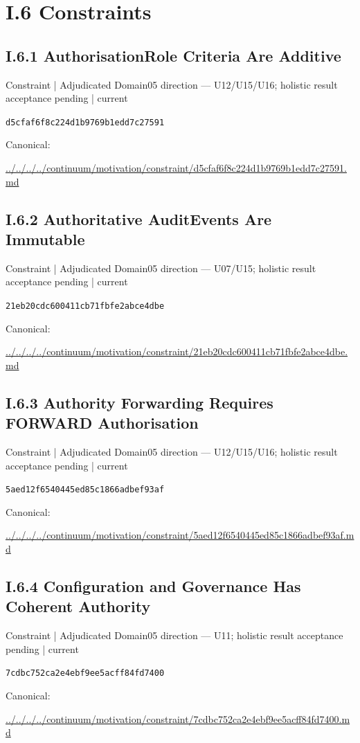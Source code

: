 \documentclass[10pt,a4paper]{article}
\begin{document}
\section*{I.6 Constraints}
\subsection*{I.6.1 AuthorisationRole Criteria Are Additive}
\label{element-d5cfaf6f8c224d1b9769b1edd7c27591}
{\small Constraint | Adjudicated Domain05 direction — U12/U15/U16; holistic result acceptance pending | current}\par
\texttt{d5cfaf6f8c224d1b9769b1edd7c27591}\par
Canonical: \par
{\footnotesize\url{../../../../continuum/motivation/constraint/d5cfaf6f8c224d1b9769b1edd7c27591.md}}\par
\subsection*{I.6.2 Authoritative AuditEvents Are Immutable}
\label{element-21eb20cdc600411cb71fbfe2abce4dbe}
{\small Constraint | Adjudicated Domain05 direction — U07/U15; holistic result acceptance pending | current}\par
\texttt{21eb20cdc600411cb71fbfe2abce4dbe}\par
Canonical: \par
{\footnotesize\url{../../../../continuum/motivation/constraint/21eb20cdc600411cb71fbfe2abce4dbe.md}}\par
\subsection*{I.6.3 Authority Forwarding Requires FORWARD Authorisation}
\label{element-5aed12f6540445ed85c1866adbef93af}
{\small Constraint | Adjudicated Domain05 direction — U12/U15/U16; holistic result acceptance pending | current}\par
\texttt{5aed12f6540445ed85c1866adbef93af}\par
Canonical: \par
{\footnotesize\url{../../../../continuum/motivation/constraint/5aed12f6540445ed85c1866adbef93af.md}}\par
\subsection*{I.6.4 Configuration and Governance Has Coherent Authority}
\label{element-7cdbc752ca2e4ebf9ee5acff84fd7400}
{\small Constraint | Adjudicated Domain05 direction — U11; holistic result acceptance pending | current}\par
\texttt{7cdbc752ca2e4ebf9ee5acff84fd7400}\par
Canonical: \par
{\footnotesize\url{../../../../continuum/motivation/constraint/7cdbc752ca2e4ebf9ee5acff84fd7400.md}}\par
\end{document}
